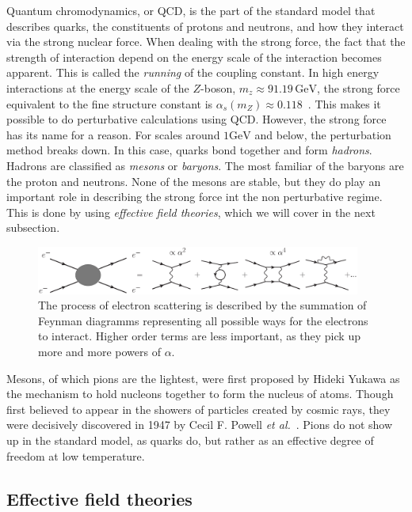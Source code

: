 Quantum chromodynamics, or QCD, is the part of the standard model that describes quarks, the constituents of protons and neutrons, and how they interact via the strong nuclear force.
When dealing with the strong force, the fact that the strength of interaction depend on the energy scale of the interaction becomes apparent.
This is called the \emph{running} of the coupling constant.
In high energy interactions at the energy scale of the $Z$-boson, $m_z \approx 91.19 \, \text{GeV}$, the strong force equivalent to the fine structure constant is $\alpha_s(m_Z) \approx 0.118$~\cite{PDG}. 
This makes it possible to do perturbative calculations using QCD.
However, the strong force has its name for a reason.
For scales around $1 \text{GeV}$ and below, the perturbation method breaks down.
In this case, quarks bond together and form \emph{hadrons}.
Hadrons are classified as \emph{mesons} or \emph{baryons}.
The most familiar of the baryons are the proton and neutrons.
None of the mesons are stable, but they do play an important role in describing the strong force int the non perturbative regime.
This is done by using \emph{effective field theories}, which we will cover in the next subsection.

\begin{figure}[h]
    \centering
    \includegraphics[width=0.95\textwidth]{figurer/feynman-diagram/sum_qed.eps}
    \caption{The process of electron scattering is described by the summation of Feynman diagramms representing all possible ways for the electrons to interact. Higher order terms are less important, as they pick up more and more powers of $\alpha$.}
    \label{fig:qed feynman diagrams}
\end{figure}

Mesons, of which pions are the lightest, were first proposed by Hideki Yukawa as the mechanism to hold nucleons together to form the nucleus of atoms.
Though first believed to appear in the showers of particles created by cosmic rays, they were decisively discovered in 1947 by Cecil F. Powell \emph{et al.}~\cite{griffiths:introduction}.
Pions do not show up in the standard model, as quarks do, but rather as an effective degree of freedom at low temperature.


\subsection*{Effective field theories}

